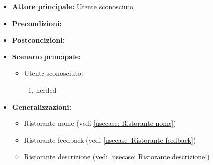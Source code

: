 \label{usecase:Lista ristoranti}
\begin{itemize}
\item \textbf{Attore principale:}  Utente sconosciuto
\item \textbf{Precondizioni:}
\item \textbf{Postcondizioni:}
\item \textbf{Scenario principale:}
\begin{itemize}
\item  Utente sconosciuto:
\begin{enumerate}
\item needed
\end{enumerate}
\end{itemize}
\item \textbf{Generalizzazioni:}
\begin{itemize}
\item  Ristorante nome (vedi \autoref{usecase: Ristorante nome})
\item  Ristorante feedback (vedi \autoref{usecase: Ristorante feedback})
\item  Ristorante descrizione (vedi \autoref{usecase: Ristorante descrizione})
\end{itemize}
\end{itemize}